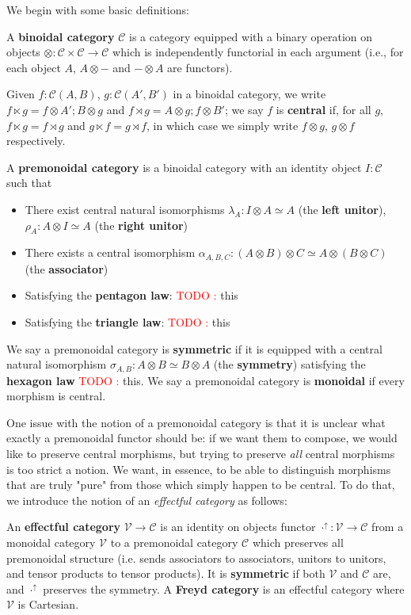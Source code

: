 \documentclass[acmsmall,screen,review]{acmart}
\newcounter{todos}
\newcommand{\todo}[1]{\stepcounter{todos} \textcolor{red}{TODO \arabic{todos}:} #1}
\newcommand{\mc}[1]{\ensuremath{\mathcal{#1}}}
\newcommand{\upg}[2]{{#1}^{\uparrow #2}}
\begin{document}
We begin with some basic definitions:
\begin{definition} 
  A \textbf{binoidal category} \(\mc{C}\) is a category equipped with a binary
  operation on objects \(\otimes: \mc{C} \times \mc{C} \to \mc{C}\) which is
  independently functorial in each argument (i.e., for each object \(A\), \(A
  \otimes -\) and \(- \otimes A\) are functors).
\end{definition}
Given \(f: \mc{C}(A, B)\), \(g: \mc{C}(A', B')\) in a binoidal category, we
write \(f \ltimes g = f \otimes A';B \otimes g\) and \(f \rtimes g = A \otimes
g;f \otimes B'\); we say \(f\) is \textbf{central} if, for all \(g\), \(f
\ltimes g = f \rtimes g\) and \(g \ltimes f = g \rtimes f\), in which case we
simply write \(f \otimes g\), \(g \otimes f\) respectively.
\begin{definition} 
  A \textbf{premonoidal category} is a binoidal category with an identity object
  \(I: \mc{C}\) such that
  \begin{itemize}
    \item There exist central natural isomorphisms \(\lambda_A: I \otimes A
    \simeq A\) (the \textbf{left unitor}), \(\rho_A: A \otimes I \simeq A\) (the
    \textbf{right unitor})
    \item There exists a central isomorphism \(\alpha_{A, B, C}: (A \otimes B)
    \otimes C \simeq A \otimes (B \otimes C)\) (the \textbf{associator})
    \item Satisfying the \textbf{pentagon law}: \todo{this}
    \item Satisfying the \textbf{triangle law}: \todo{this}
  \end{itemize}
  We say a premonoidal category is \textbf{symmetric} if it is equipped with a
  central natural isomorphism \(\sigma_{A, B}: A \otimes B \simeq B \otimes A\)
  (the \textbf{symmetry}) satisfying the \textbf{hexagon law} \todo{this}. We
  say a premonoidal category is \textbf{monoidal} if every morphism is central.
\end{definition}
One issue with the notion of a premonoidal category is that it is unclear what
exactly a premonoidal functor should be: if we want them to compose, we would
like to preserve central morphisms, but trying to preserve \textit{all} central
morphisms is too strict a notion. We want, in essence, to be able to distinguish
morphisms that are truly "pure" from those which simply happen to be central. To
do that, we introduce the notion of an \textit{effectful category} as follows:
\begin{definition} 
  An \textbf{effectful category} \(\mc{V} \to \mc{C}\) is an identity on objects
  functor \(\upg{\cdot}{}: \mc{V} \to \mc{C}\) from a monoidal category
  \(\mc{V}\) to a premonoidal category \(\mc{C}\) which preserves all
  premonoidal structure (i.e. sends associators to associators, unitors to
  unitors, and tensor products to tensor products). It is \textbf{symmetric} if
  both \(\mc{V}\) and \(\mc{C}\) are, and \(\upg{\cdot}{}\) preserves the
  symmetry. A \textbf{Freyd category} is an effectful category where \(\mc{V}\)
  is Cartesian.
\end{definition}
\end{document}

